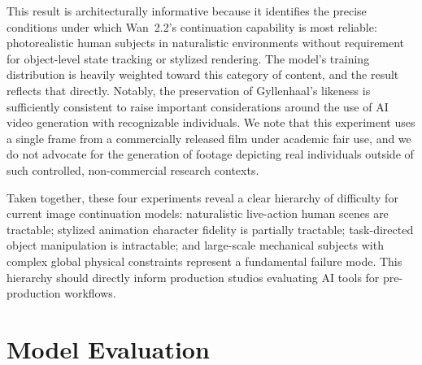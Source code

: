 \documentclass[sigconf]{acmart}
\begin{document}
This result is architecturally informative because it identifies
the precise conditions under which Wan~2.2's continuation
capability is most reliable: photorealistic human subjects in
naturalistic environments without requirement for object-level
state tracking or stylized rendering. The model's training
distribution is heavily weighted toward this category of content,
and the result reflects that directly. Notably, the preservation
of Gyllenhaal's likeness is sufficiently
consistent to raise important considerations around the use of
AI video generation with recognizable individuals. We note that
this experiment uses a single frame from a commercially released
film under academic fair use, and we do not advocate for the
generation of footage depicting real individuals outside of such
controlled, non-commercial research contexts.

Taken together, these four experiments reveal a clear hierarchy
of difficulty for current image continuation models: naturalistic
live-action human scenes are tractable; stylized animation
character fidelity is partially tractable; task-directed object
manipulation is intractable; and large-scale mechanical subjects
with complex global physical constraints represent a fundamental
failure mode. This hierarchy should directly inform production
studios evaluating AI tools for pre-production workflows.
\section{Model Evaluation}
\label{sec:evaluation}
\end{document}
